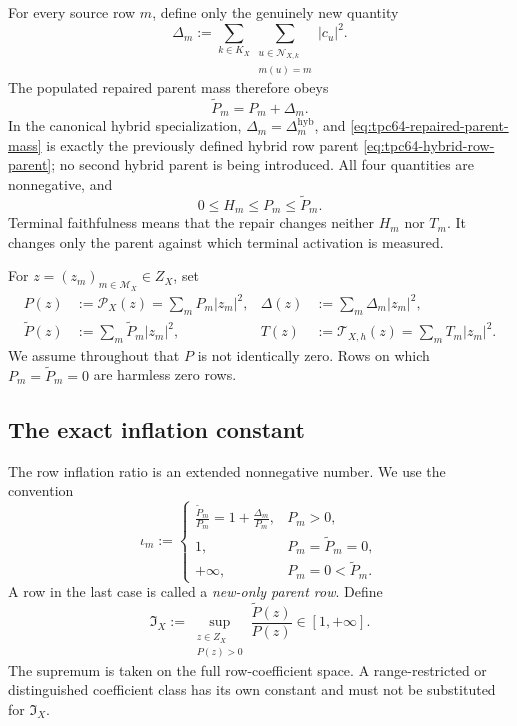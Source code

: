 For every source row \(m\), define only the genuinely new quantity
\begin{equation}
 \Delta_m
 :=\sum_{k\in K_X}
     \sum_{\substack{u\in\mathcal N_{X,k}\\m(u)=m}}
       |c_u|^2.
 \label{eq:tpc64-added-parent-mass}
\end{equation}
The populated repaired parent mass therefore obeys
\begin{equation}
 \widetilde P_m=P_m+\Delta_m.
 \label{eq:tpc64-repaired-parent-mass}
\end{equation}
In the canonical hybrid specialization,
\(\Delta_m=\Delta_m^{\mathrm{hyb}}\), and
\eqref{eq:tpc64-repaired-parent-mass} is exactly the previously defined
hybrid row parent \eqref{eq:tpc64-hybrid-row-parent}; no second hybrid
parent is being introduced.
All four quantities are nonnegative, and
\begin{equation}
 0\le H_m\le P_m\le\widetilde P_m.
 \label{eq:tpc64-row-mass-order}
\end{equation}
Terminal faithfulness means that the repair changes neither \(H_m\) nor
\(T_m\).  It changes only the parent against which terminal activation is
measured.

For \(z=(z_m)_{m\in\mathcal M_X}\in Z_X\), set
\begin{align}
 P(z)&:=\mathcal P_X(z)=\sum_mP_m|z_m|^2,
 &
 \Delta(z)&:=\sum_m\Delta_m|z_m|^2,
 \label{eq:tpc64-parent-added-forms}\\
 \widetilde P(z)&:=\sum_m\widetilde P_m|z_m|^2,
 &
 T(z)&:=\mathcal T_{X,h}(z)=\sum_mT_m|z_m|^2.
 \label{eq:tpc64-repaired-terminal-forms}
\end{align}
We assume throughout that \(P\) is not identically zero.  Rows on which
\(P_m=\widetilde P_m=0\) are harmless zero rows.

\subsection{The exact inflation constant}

The row inflation ratio is an extended nonnegative number.  We use the
convention
\begin{equation}
 \iota_m:=
 \begin{cases}
  \displaystyle\frac{\widetilde P_m}{P_m}
   =1+\frac{\Delta_m}{P_m},&P_m>0,\\[8pt]
  1,&P_m=\widetilde P_m=0,\\
  +\infty,&P_m=0<\widetilde P_m.
 \end{cases}
 \label{eq:tpc64-row-inflation-convention}
\end{equation}
A row in the last case is called a \emph{new-only parent row}.  Define
\begin{equation}
 \mathfrak I_X
 :=\sup_{\substack{z\in Z_X\\P(z)>0}}
       \frac{\widetilde P(z)}{P(z)}
 \in[1,+\infty].
 \label{eq:tpc64-global-inflation-constant}
\end{equation}
The supremum is taken on the full row-coefficient space.  A
range-restricted or distinguished coefficient class has its own constant
and must not be substituted for \(\mathfrak I_X\).

